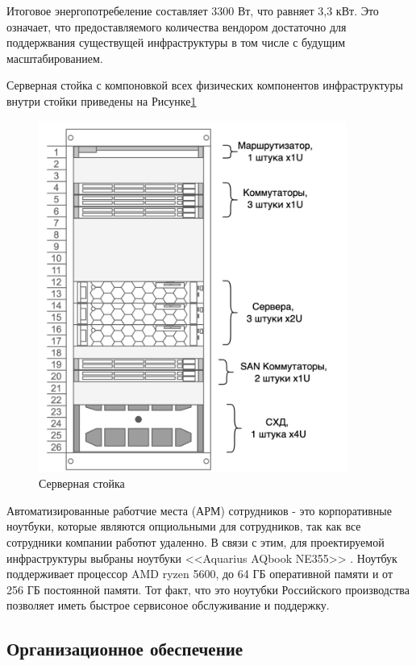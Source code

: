 \documentclass[14pt, a4paper]{extarticle}
\begin{document}
Итоговое энергопотребеление составляет 3300 Вт, что равняет 3,3 кВт. Это означает,
что предоставляемого количества вендором достаточно для поддержвания существущей
инфраструктуры в том числе с будущим масштабированием.

Серверная стойка с компоновкой всех физических компонентов инфраструктуры внутри стойки
приведены на Рисунке\;\ref{fig:server_rack}

\begin{figure}[H]
  \centering
  \includegraphics[width=0.9\textwidth]{server_rack.png}
  \caption{Серверная стойка}
  \label{fig:server_rack}
\end{figure}

Автоматизированные работчие места (АРМ) сотрудников - это корпоративные ноутбуки, которые
являются опциольными для сотрудников, так как все сотрудники компании работют удаленно.
В связи с этим, для проектируемой инфраструктуры выбраны ноутбуки <<Aquarius AQbook NE355>> \cite{aquarius-aqbook-NE355}.
Ноутбук поддерживает процессор AMD ryzen 5600, до 64 ГБ оперативной памяти и от 256 ГБ
постоянной памяти. Тот факт, что это ноутубки Российского производства позволяет
иметь быстрое сервисоное обслуживание и поддержку.

\subsection{Организационное обеспечение}
\end{document}
